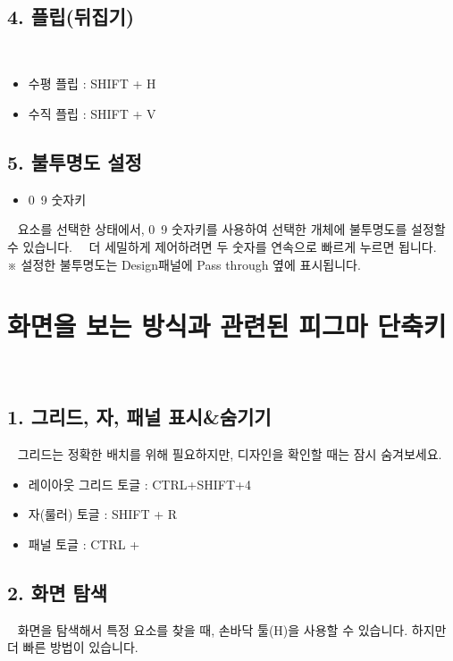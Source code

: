 \documentclass[12pt, a4paper, oneside]{book}
\begin{document}
 
 
	\subsection{4. 플립(뒤집기)}
 

			\begin{itemize}[topsep=0.0em, parsep=0.0em, itemsep=0em, leftmargin=6.0em, labelwidth=3em, labelsep=1em] 
			\item 	수평 플립 : SHIFT + H
			\item 	수직 플립 : SHIFT + V
			\end{itemize}



	\subsection{5. 불투명도 설정}

			\begin{itemize}[topsep=0.0em, parsep=0.0em, itemsep=0em, leftmargin=6.0em, labelwidth=3em, labelsep=1em] 
			\item 	0~9 숫자키
			\end{itemize}
 
요소를 선택한 상태에서, 0~9 숫자키를 사용하여 선택한 개체에 불투명도를 설정할 수 있습니다.  
더 세밀하게 제어하려면 두 숫자를 연속으로 빠르게 누르면 됩니다.\\
※ 설정한 불투명도는 Design패널에 Pass through 옆에 표시됩니다.



	\section{화면을 보는 방식과 관련된 피그마 단축키}
 
	\subsection{1. 그리드, 자, 패널 표시\&숨기기}
 
그리드는 정확한 배치를 위해 필요하지만, 디자인을 확인할 때는 잠시 숨겨보세요.
 

			\begin{itemize}[topsep=0.0em, parsep=0.0em, itemsep=0em, leftmargin=6.0em, labelwidth=3em, labelsep=1em] 
			\item 	레이아웃 그리드 토글 : CTRL+SHIFT+4
			\item 	자(룰러) 토글 : SHIFT + R
			\item 	패널 토글 : CTRL + \
			\end{itemize}



	\subsection{2. 화면 탐색}
 
화면을 탐색해서 특정 요소를 찾을 때, 손바닥 툴(H)을 사용할 수 있습니다. 하지만 더 빠른 방법이 있습니다.
 
\end{document}
